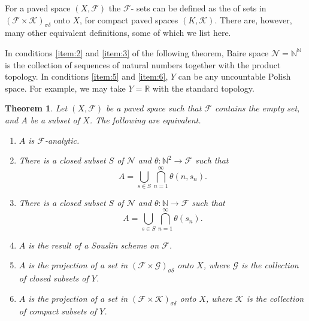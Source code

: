 \documentclass[12pt]{article}
\newtheorem*{theorem*}{Theorem}
\begin{document}

For a paved space $(X,\mathcal{F})$ the $\mathcal{F}$- sets can be defined as the  of sets in $(\mathcal{F}\times\mathcal{K})_{\sigma\delta}$ onto $X$, for compact paved spaces $(K,\mathcal{K})$. There are, however, many other equivalent definitions, some of which we list here.

In conditions \ref{item:2} and \ref{item:3} of the following theorem, Baire space $\mathcal{N}=\mathbb{N}^\mathbb{N}$ is the collection of sequences of natural numbers together with the product topology.
In conditions \ref{item:5} and \ref{item:6}, $Y$ can be any uncountable Polish space. For example, we may take $Y=\mathbb{R}$ with the standard topology.

\begin{theorem*}
Let $(X,\mathcal{F})$ be a paved space such that $\mathcal{F}$ contains the empty set, and $A$ be a subset of $X$. The following are equivalent.
\begin{enumerate}
\item $A$ is $\mathcal{F}$-analytic.
\item\label{item:2} There is a closed subset $S$ of $\mathcal{N}$ and $\theta\colon \mathbb{N}^2\to\mathcal{F}$ such that
\begin{equation*}
A=\bigcup_{s\in S}\bigcap_{n=1}^\infty \theta\left(n,s_n\right).
\end{equation*}
\item\label{item:3} There is a closed subset $S$ of $\mathcal{N}$ and $\theta\colon \mathbb{N}\to\mathcal{F}$ such that
\begin{equation*}
A=\bigcup_{s\in S}\bigcap_{n=1}^\infty \theta\left(s_n\right).
\end{equation*}
\item $A$ is the result of a Souslin scheme on $\mathcal{F}$.
\item\label{item:5} $A$ is the projection of a set in $(\mathcal{F}\times\mathcal{G})_{\sigma\delta}$ onto $X$, where $\mathcal{G}$ is the collection of closed subsets of $Y$.
\item\label{item:6} $A$ is the projection of a set in $(\mathcal{F}\times\mathcal{K})_{\sigma\delta}$ onto $X$, where $\mathcal{K}$ is the collection of compact subsets of $Y$.
\end{enumerate}
\end{theorem*}
\end{document}
